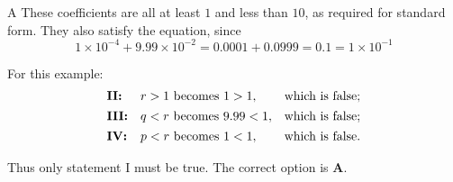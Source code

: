 \documentclass[11pt,a4paper]{article}
\begin{document}
\begin{enumerate}[label=\textbf{\arabic*.},leftmargin=*,itemsep=0pt,start=12]
\begin{djsSolution}{A}
These coefficients are all at least $1$ and less than $10$, as required for standard form. They also satisfy the equation, since
\[
1\times10^{-4}+9.99\times10^{-2}
=0.0001+0.0999
=0.1
=1\times10^{-1}
\]

For this example:
\[
\begin{array}{@{}lll@{}}
\textbf{II:} & r>1 \text{ becomes } 1>1, & \text{which is false};\\[4pt]
\textbf{III:} & q<r \text{ becomes } 9.99<1, & \text{which is false};\\[4pt]
\textbf{IV:} & p<r \text{ becomes } 1<1, & \text{which is false}.
\end{array}
\]

Thus only statement I must be true. The correct option is \textbf{A}.
\end{djsSolution}
\end{enumerate}
\clearpage
\thispagestyle{djssolutions}
\vspace*{8pt}
\end{document}
